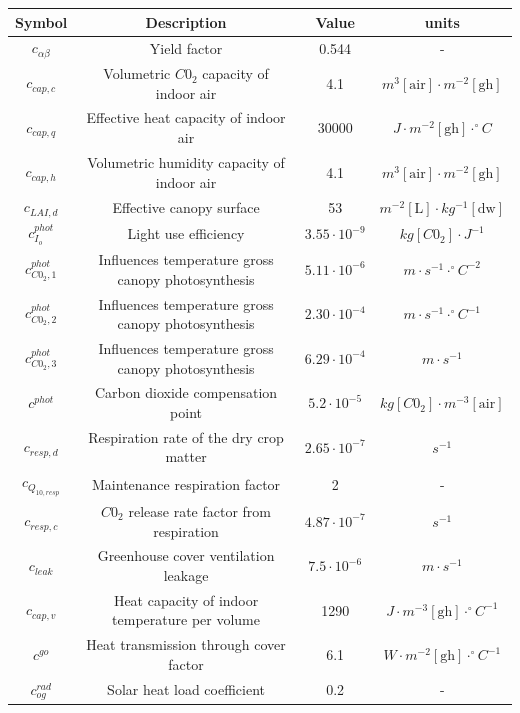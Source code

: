 \begin{table}[H]
	\centering
	\begin{tabular}{|c|c|c|c|}
		\hline
		Symbol & Description & Value & units 
		\\ \hline
		$c_{\alpha \beta}$& Yield factor &0.544 &-
		\\
		$c_{cap,c}$& Volumetric $C0_2$ capacity of indoor air & 4.1& $m^3 [\text{air}] \cdot m^{-2} [\text{gh}]$
		\\
		$c_{cap,q}$& Effective heat capacity of indoor air &30000 & $J \cdot m^{-2} [\text{gh}] \cdot ^{\circ}C$
		\\
		$c_{cap,h}$&Volumetric humidity  capacity of indoor air & 4.1& $m^3 [\text{air}] \cdot m^{-2} [\text{gh}]$
		\\
		$c_{LAI,d}$&Effective canopy surface & 53& $m^{-2} [\text{L}] \cdot kg^{-1} [\text{dw}]$
		\\
		$c_{I_o}^{phot}$&Light use efficiency & $3.55 \cdot 10^{-9}$& $kg [C0_2] \cdot J^{-1}$
		\\
		$c_{C0_2,1}^{phot}$& Influences temperature gross canopy photosynthesis& $5.11 \cdot 10^{-6}$ & $m \cdot s^{-1} \cdot ^\circ C^{-2}$
		\\
		$c_{C0_2,2}^{phot}$& Influences temperature gross canopy photosynthesis& $2.30 \cdot 10^{-4}$& $m \cdot s^{-1} \cdot ^\circ C^{-1}$
		\\
		$c_{C0_2,3}^{phot}$&Influences temperature gross canopy photosynthesis &$6.29 \cdot 10^{-4}$ &$m \cdot s^{-1}$
		\\
		$c^{phot}$& Carbon dioxide compensation point &$5.2 \cdot 10^{-5}$ &$kg [C0_2] \cdot m^{-3} [\text{air}]$
		\\
		$c_{resp,d}$&Respiration rate of the dry crop matter & $2.65 \cdot 10^{-7}$& $s^{-1}$
		\\
		$c_{Q_{10,resp}}$& Maintenance respiration factor &2 &-
		\\
		$c_{resp,c}$& $C0_2$ release rate factor from respiration &$4.87 \cdot 10^{-7}$ & $s^{-1}$
		\\
		$c_{leak}$& Greenhouse cover ventilation leakage&$7.5 \cdot 10^{-6}$ & $m \cdot s^{-1}$
		\\
		$c_{cap,v}$& Heat capacity of indoor temperature per volume & 1290 & $J \cdot m^{-3} [\text{gh}] \cdot ^\circ C^{-1}$
		\\
		$c^{go}$& Heat transmission through cover factor &6.1 &$W \cdot m^{-2} [\text{gh}] \cdot ^\circ C^{-1}$
		\\
		$c_{og}^{rad}$&Solar heat load coefficient & 0.2&-

\end{tabular}
\end{table}
